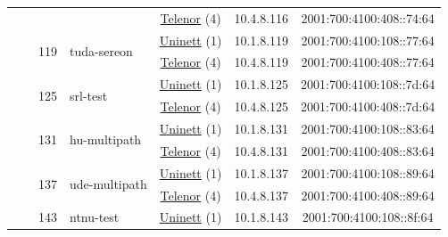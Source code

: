 \begin{small}
\begin{center}
\begin{longtable}{|c|c|c|c|c|c|c|c|}
  &  &  &  & \multicolumn{2}{|c|}{\tiny{\href{https://www.telenor.no}{Telenor} (4)}} & \tiny{10.4.8.116} & \tiny{2001:700:4100:408::74:64} \\* \cline{3-3}\cline{4-4}\cline{5-5}\cline{6-6}\cline{7-7}\cline{8-8}
  &  & \multirow{2}{*}{\tiny{119}} & \multicolumn{1}{|l|}{\multirow{2}{*}{\tiny{tuda-sereon}}} & \multicolumn{2}{|c|}{\tiny{\href{https://www.uninett.no}{Uninett} (1)}} & \tiny{10.1.8.119} & \tiny{2001:700:4100:108::77:64} \\* \cline{5-5}\cline{6-6}\cline{7-7}\cline{8-8}
  &  &  &  & \multicolumn{2}{|c|}{\tiny{\href{https://www.telenor.no}{Telenor} (4)}} & \tiny{10.4.8.119} & \tiny{2001:700:4100:408::77:64} \\* \cline{3-3}\cline{4-4}\cline{5-5}\cline{6-6}\cline{7-7}\cline{8-8}
  &  & \multirow{2}{*}{\tiny{125}} & \multicolumn{1}{|l|}{\multirow{2}{*}{\tiny{srl-test}}} & \multicolumn{2}{|c|}{\tiny{\href{https://www.uninett.no}{Uninett} (1)}} & \tiny{10.1.8.125} & \tiny{2001:700:4100:108::7d:64} \\* \cline{5-5}\cline{6-6}\cline{7-7}\cline{8-8}
  &  &  &  & \multicolumn{2}{|c|}{\tiny{\href{https://www.telenor.no}{Telenor} (4)}} & \tiny{10.4.8.125} & \tiny{2001:700:4100:408::7d:64} \\* \cline{3-3}\cline{4-4}\cline{5-5}\cline{6-6}\cline{7-7}\cline{8-8}
  &  & \multirow{2}{*}{\tiny{131}} & \multicolumn{1}{|l|}{\multirow{2}{*}{\tiny{hu-multipath}}} & \multicolumn{2}{|c|}{\tiny{\href{https://www.uninett.no}{Uninett} (1)}} & \tiny{10.1.8.131} & \tiny{2001:700:4100:108::83:64} \\* \cline{5-5}\cline{6-6}\cline{7-7}\cline{8-8}
  &  &  &  & \multicolumn{2}{|c|}{\tiny{\href{https://www.telenor.no}{Telenor} (4)}} & \tiny{10.4.8.131} & \tiny{2001:700:4100:408::83:64} \\* \cline{3-3}\cline{4-4}\cline{5-5}\cline{6-6}\cline{7-7}\cline{8-8}
  &  & \multirow{2}{*}{\tiny{137}} & \multicolumn{1}{|l|}{\multirow{2}{*}{\tiny{ude-multipath}}} & \multicolumn{2}{|c|}{\tiny{\href{https://www.uninett.no}{Uninett} (1)}} & \tiny{10.1.8.137} & \tiny{2001:700:4100:108::89:64} \\* \cline{5-5}\cline{6-6}\cline{7-7}\cline{8-8}
  &  &  &  & \multicolumn{2}{|c|}{\tiny{\href{https://www.telenor.no}{Telenor} (4)}} & \tiny{10.4.8.137} & \tiny{2001:700:4100:408::89:64} \\* \cline{3-3}\cline{4-4}\cline{5-5}\cline{6-6}\cline{7-7}\cline{8-8}
  &  & \multirow{2}{*}{\tiny{143}} & \multicolumn{1}{|l|}{\multirow{2}{*}{\tiny{ntnu-test}}} & \multicolumn{2}{|c|}{\tiny{\href{https://www.uninett.no}{Uninett} (1)}} & \tiny{10.1.8.143} & \tiny{2001:700:4100:108::8f:64} \\* \cline{5-5}\cline{6-6}\cline{7-7}\cline{8-8}

\end{longtable}
\end{center}
\end{small}
